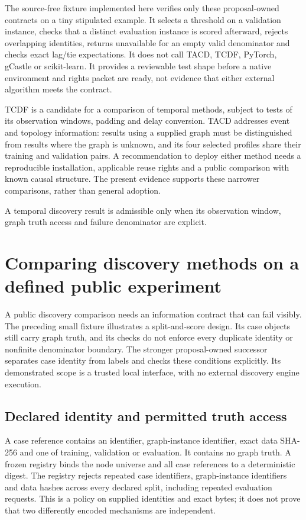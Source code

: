 The source-free fixture implemented here verifies only these proposal-owned contracts on a tiny
stipulated example. It selects a threshold on a validation instance, checks that a distinct
evaluation instance is scored afterward, rejects overlapping identities, returns unavailable
for an empty valid denominator and checks exact lag/tie expectations. It does not call TACD,
TCDF, PyTorch, gCastle or scikit-learn. It provides a reviewable test shape before a native
environment and rights packet are ready, not evidence that either external algorithm meets the
contract.

TCDF is a candidate for a comparison of temporal methods, subject to
tests of its observation windows, padding and delay conversion. TACD addresses
event and topology information: results using a supplied graph must be
distinguished from results where the graph is unknown, and its four selected
profiles share their training and validation pairs. A recommendation to deploy
either method needs a reproducible installation, applicable reuse rights and
a public comparison with known causal structure. The present evidence supports
these narrower comparisons, rather than general adoption.

A temporal discovery result is admissible only when its observation window, graph truth access and failure denominator are explicit.


\section[Enforcing a public discovery evaluation contract]{Comparing discovery methods on a defined public experiment}
\label{sec:exec28-fj-fixture}
A public discovery comparison needs an information contract that can fail visibly.
The preceding small fixture illustrates a split-and-score design. Its case objects
still carry graph truth, and its checks do not enforce every duplicate identity or
nonfinite denominator boundary. The stronger proposal-owned successor separates
case identity from labels and checks these conditions explicitly. Its demonstrated
scope is a trusted local interface, with no external discovery engine execution.
\citep{exec28_fj_contract}

\subsection{Declared identity and permitted truth access}
A case reference contains an identifier, graph-instance identifier, exact data
SHA-256 and one of training, validation or evaluation. It contains no graph
truth. A frozen registry binds the node universe and all case references to a
deterministic digest. The registry rejects repeated case identifiers, graph-instance
identifiers and data hashes across every declared split, including repeated
evaluation requests. This is a policy on supplied identities and exact bytes;
it does not prove that two differently encoded mechanisms are independent.
\citep{exec28_fj_contract}

